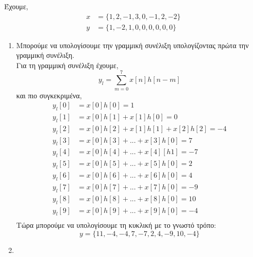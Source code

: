 Έχουμε,
\begin{align*}
    x &= \{1,2,-1,3,0,-1,2,-2\} \\
    y &= \{1,-2,1,0,0,0,0,0,0\}
\end{align*}

\begin{enumerate}[label=\textbf{(\alph*)}]
\item
    Μπορούμε να υπολογίσουμε την γραμμική συνέλιξη υπολογίζοντας πρώτα την γραμμική συνέλιξη. \\
    Για τη γραμμική συνέλιξη έχουμε,
        \begin{equation*} y_l = \sum_{m=0}^{7} x[n]h[n-m] \end{equation*}
    και πιο συγκεκριμένα,
    \begin{align*}
        y_l[0] &= x[0]h[0] = 1 \\
        y_l[1] &= x[0]h[1] + x[1]h[0] = 0 \\
        y_l[2] &= x[0]h[2] + x[1]h[1] + x[2]h[2] = -4 \\
        y_l[3] &= x[0]h[3] + ... + x[3]h[0] = 7 \\
        y_l[4] &= x[0]h[4] + ... + x[4][h1] = -7 \\
        y_l[5] &= x[0]h[5] + ... + x[5]h[0] = 2 \\
        y_l[6] &= x[0]h[6] + ... + x[6]h[0] = 4 \\
        y_l[7] &= x[0]h[7] + ... + x[7]h[0] = -9 \\
        y_l[8] &= x[0]h[8] + ... + x[8]h[0] = 10 \\
        y_l[9] &= x[0]h[9] + ... + x[9]h[0] = -4 \\
    \end{align*}
    Τώρα μπορούμε να υπολογίσουμε τη κυκλική με το γνωστό τρόπο:
        \begin{equation*} y = \{11, -4, -4, 7, -7, 2, 4, -9, 10, -4\} \end{equation*}

\item

\end{enumerate}

